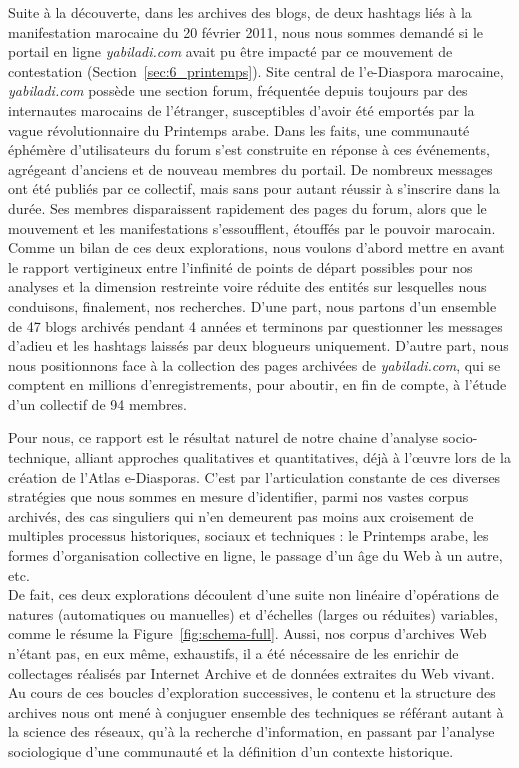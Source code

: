 \documentclass[symmetric,justified,marginals=raggedouter]{tufte-book}
\begin{document}
Suite à la découverte, dans les archives des blogs, de deux hashtags liés à la manifestation marocaine du 20 février 2011, nous nous sommes demandé si le portail en ligne \textit{yabiladi.com} avait pu être impacté par ce mouvement de contestation (Section~\ref{sec:6_printemps}). Site central de l'e-Diaspora marocaine, \textit{yabiladi.com} possède une section forum, fréquentée depuis toujours par des internautes marocains de l'étranger, susceptibles d'avoir été emportés par la vague révolutionnaire du Printemps arabe. Dans les faits, une communauté éphémère d'utilisateurs du forum s'est construite en réponse à ces événements, agrégeant d'anciens et de nouveau membres du portail. De nombreux messages ont été publiés par ce collectif, mais sans pour autant réussir à s'inscrire dans la durée. Ses membres disparaissent rapidement des pages du forum, alors que le mouvement et les manifestations s'essoufflent, étouffés par le pouvoir marocain. \\

\noindent Comme un bilan de ces deux explorations, nous voulons d'abord mettre en avant le rapport vertigineux entre l'infinité de points de départ possibles pour nos analyses et la dimension restreinte voire réduite des entités sur lesquelles nous conduisons, finalement, nos recherches. D'une part, nous partons d'un ensemble de 47 blogs archi\-vés pendant 4 années et terminons par questionner les messages d'adieu et les hashtags laissés par deux blogueurs uniquement. D'autre part, nous nous positionnons face à la collection des pages archivées de \textit{yabiladi.com}, qui se comptent en millions d'enregistrements, pour aboutir, en fin de compte, à l'étude d'un collectif de 94 membres. 

Pour nous, ce rapport est le résultat naturel de notre chaine d'analyse socio-technique, alliant approches qualitatives et quantitatives, déjà à l'œuvre lors de la création de l'Atlas e-Diasporas. C'est par l'articulation constante de ces diverses stratégies que nous sommes en mesure d'iden\-tifier, parmi nos vastes corpus archivés, des cas singuliers qui n'en demeurent pas moins aux croisement de multiples processus historiques, sociaux et techniques : le Printemps arabe, les formes d'organisation collective en ligne, le passage d'un âge du Web à un autre, etc. \\

\noindent De fait, ces deux explorations découlent d'une suite non linéaire d'opé\-rations de natures (automatiques ou manuelles) et d'échelles (lar\-ges ou réduites) variables, comme le résume la Figure~\ref{fig:schema-full}. Aussi, nos corpus d'archives Web n'étant pas, en eux même, exhaustifs, il a été nécessaire de les enrichir de collectages réalisés par Internet Archive et de données extraites du Web vivant. Au cours de ces boucles d'exploration successives, le contenu et la structure des archives nous ont mené à conjuguer ensemble des techniques se référant autant à la science des réseaux, qu'à la recherche d'information, en passant par l'analyse sociologique d'une communauté et la définition d'un contexte historique.
\end{document}
